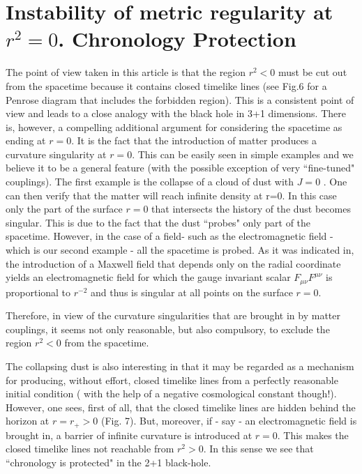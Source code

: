 \documentclass[12pt]{article}
\newcounter{c1} \newcounter{c2}
\begin{document}

\section{Instability of metric regularity at $r^2=0$. \newline
Chronology Protection}

 The point of view taken in this article is that the region $r^2<0$  must be
cut out from the spacetime because it contains
closed timelike lines (see Fig.6 for a Penrose diagram that includes the
forbidden region). This is a consistent point of view and leads to a close
analogy with the black hole in  3+1 dimensions. There is, however, a
compelling additional argument for considering the spacetime as ending at
$r=0$. It is the fact that the introduction of matter produces a curvature
singularity at $r=0$. This can be easily seen in simple examples and we
believe it to be a general feature (with the possible exception of very
``fine-tuned" couplings).
  The first example is the collapse of a cloud of dust with $J=0$ \cite{12}.
One can then verify that the matter will reach infinite density at r=0.
In this case only the part of the surface $r=0$ that intersects the history
of the dust becomes singular. This is due to the fact that the dust ``probes"
only part of the spacetime. However, in the case of a field- such as the
electromagnetic field - which is our second example - all the spacetime is
 probed.
   As it was indicated in\cite{1}, the introduction of a Maxwell field that
depends
only on the radial coordinate yields an electromagnetic field for which
the gauge invariant scalar $F_{\mu \nu} F^{\mu \nu}$ is proportional to
$r^{-2}$ and thus is singular at all points on the surface $r=0.$

Therefore, in view of the curvature singularities that are
brought in by matter couplings, it seems not only reasonable,
but also compulsory, to exclude the region $r^{2} < 0$ from the
spacetime.

  The collapsing dust is also interesting in that it may be regarded as a
mechanism for producing, without effort, closed timelike lines from a
perfectly
reasonable initial condition ( with the help of a negative cosmological
constant though!). However, one sees, first of all, that the closed timelike
lines are hidden behind the horizon at $r=r_+ >0$ (Fig. 7). But,
moreover, if - say - an electromagnetic field is brought in, a barrier of
 infinite
curvature is introduced at $r=0$. This makes the closed timelike lines not
reachable from $r^2 > 0$.  In this sense we see that
``chronology is protected" \cite{13} in the 2+1 black-hole.
\end{document}
